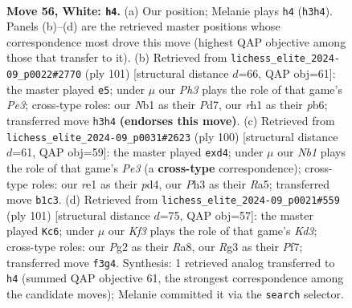 \documentclass[11pt]{article}
\begin{document}
\clearpage

\begin{figure}[p]\centering
\begin{subfigure}{0.46\textwidth}\centering
\resizebox{\linewidth}{!}{%
\newchessgame
\chessboard[
  setfen={7k/5p1p/1n4p1/p3p1P1/P3P3/1P3KRP/6P1/RN2r2r w - - 26 56},
  showmover=false,
  pgfstyle=straightmove, color=movearrow, markmove={h3-h4}
]}
\caption{}
\end{subfigure}\hfill
\begin{subfigure}{0.46\textwidth}\centering
\resizebox{\linewidth}{!}{%
\newchessgame
\chessboard[
  setfen={3rk3/2Rp4/1P2p1Np/n1P2p1r/5p1P/5P2/5K2/7R b - - 0 51},
  showmover=false,
  pgfstyle=straightmove, color=movearrow, markmove={e6-e5}
]}
\caption{}
\end{subfigure}
\\[4pt]
\begin{subfigure}{0.46\textwidth}\centering
\resizebox{\linewidth}{!}{%
\newchessgame
\chessboard[
  setfen={1k6/1r6/1P2r1p1/R1P2p1p/P2p1P2/1R2P1PK/8/8 w - - 0 51},
  showmover=false,
  pgfstyle=straightmove, color=movearrow, markmove={e3-d4}
]}
\caption{}
\end{subfigure}\hfill
\begin{subfigure}{0.46\textwidth}\centering
\resizebox{\linewidth}{!}{%
\newchessgame
\chessboard[
  setfen={r7/5pp1/r2kp2p/3p4/3PPP2/p4K2/R7/R7 b - - 0 51},
  showmover=false,
  pgfstyle=straightmove, color=movearrow, markmove={d6-c6}
]}
\caption{}
\end{subfigure}
\caption{\textbf{Move 56, White: \texttt{h4}.} (a) Our position; Melanie plays \texttt{h4} (\texttt{h3h4}). Panels (b)--(d) are the retrieved master positions whose correspondence most drove this move (highest QAP objective among those that transfer to it). (b) Retrieved from \texttt{lichess\_elite\_2024-09\_p0022\#2770} (ply 101) [structural distance $d$=66, QAP obj=61]: the master played \texttt{e5}; under $\mu$ our \emph{Ph3} plays the role of that game's \emph{Pe3}; cross-type roles: our \emph{N}b1 as their \emph{P}d7, our \emph{r}h1 as their \emph{p}b6; transferred move \texttt{h3h4} \textbf{(endorses this move)}. (c) Retrieved from \texttt{lichess\_elite\_2024-09\_p0031\#2623} (ply 100) [structural distance $d$=61, QAP obj=59]: the master played \texttt{exd4}; under $\mu$ our \emph{Nb1} plays the role of that game's \emph{Pe3} (a \textbf{cross-type} correspondence); cross-type roles: our \emph{r}e1 as their \emph{p}d4, our \emph{P}h3 as their \emph{R}a5; transferred move \texttt{b1c3}. (d) Retrieved from \texttt{lichess\_elite\_2024-09\_p0021\#559} (ply 101) [structural distance $d$=75, QAP obj=57]: the master played \texttt{Kc6}; under $\mu$ our \emph{Kf3} plays the role of that game's \emph{Kd3}; cross-type roles: our \emph{P}g2 as their \emph{R}a8, our \emph{R}g3 as their \emph{P}f7; transferred move \texttt{f3g4}. Synthesis: 1 retrieved analog transferred to \texttt{h4} (summed QAP objective 61, the strongest correspondence among the candidate moves); Melanie committed it via the \texttt{search} selector.}
\label{fig:thought-m110}
\end{figure}
\end{document}
